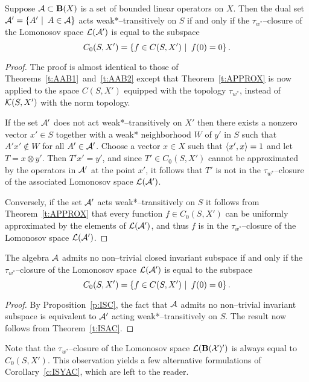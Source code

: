 \begin{thm} \label{t:ISAC}
Suppose ${\cal A}\subset{}\mathbf{B}(X)$ is a set of bounded linear
operators on $X$. Then the dual set
${\cal A}'=\left\{A'\,\,|\,\,\,A\in{\cal A}\right\}$ acts weak*--transitively on $S$
if and only if the $\tau_{w^*}$--closure of the Lomonosov space
$\cal{L}({\cal A}')$ is equal to the subspace
\[ C_0(S,X') = \left\{f\in C(S,X')\,\,|\,\,\, f(0) = 0 \right\}. \]
\end{thm}

\begin{proof}
The proof is almost identical to those of
Theorems~\ref{t:AAB1}~and~\ref{t:AAB2} except that
Theorem~\ref{t:APPROX} is now applied to the space $C(S,X')$
equipped with the topology $\tau_{w^*}$, instead of ${\cal
K}(S,X')$ with the norm topology.

If the set ${\cal A}'$ does not act weak*--transitively on $X'$ then
there exists a nonzero vector $x' \in S$ together with a weak*
neighborhood $W$ of $y'$ in $S$ such that $A' x' \not\in W$ for
all $A'\in {\cal A}'$. Choose a vector $x \in X$ such that
$\left<x',x\right>=1$ and let $T=x\otimes{}y'$. Then $T' x' = y'$, and
since $T'\in C_0(S,X')$ cannot be approximated by the operators
in ${\cal A}'$ at the point $x'$, it follows that $T'$ is not in the
$\tau_{w^*}$--closure of the associated Lomonosov space
$\cal{L}({\cal A}')$.

Conversely, if the set ${\cal A}'$ acts weak*--transitively on $S$ it
follows from Theorem~\ref{t:APPROX} that every function
$f\in{}C_0(S,X')$ can be uniformly approximated by the elements
of $\cal{L}({\cal A}')$, and thus $f$ is in the $\tau_{w^*}$--closure
of the Lomonosov space $\cal{L}({\cal A}')$.
\end{proof}

\begin{cor} \label{c:ISYAC}
The algebra ${\cal A}$ admits no non--trivial closed invariant
subspace if and only if the $\tau_{w^*}$--closure of the
Lomonosov space $\cal{L}({\cal A}')$ is equal to the subspace
\[ C_0(S,X') = \left\{f\in C(S,X')\,\,|\,\,\, f(0) = 0 \right\}. \]
\end{cor}

\begin{proof}
By Proposition~\ref{p:ISC}, the fact that ${\cal A}$ admits no
non--trivial invariant subspace is equivalent to ${\cal A}'$ acting
weak*--transitively on $S$. The result now follows from
Theorem~\ref{t:ISAC}.
\end{proof}

\medskip

Note that the $\tau_{w^*}$--closure of the Lomonosov space
$\cal{L}(\mathbf{B}(X)')$ is always equal to $C_0(S,X')$. This
observation yields a few alternative formulations of
Corollary~\ref{c:ISYAC}, which are left to the reader.

